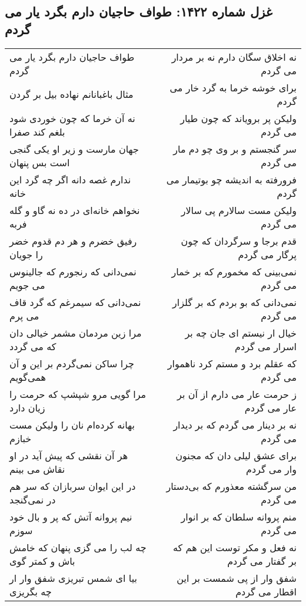 \begin{center}
\section*{غزل شماره ۱۴۲۲: طواف حاجیان دارم بگرد یار می گردم}
\label{sec:1422}
\begin{longtable}{l p{0.5cm} r}
طواف حاجیان دارم بگرد یار می گردم
&&
نه اخلاق سگان دارم نه بر مردار می گردم
\\
مثال باغبانانم نهاده بیل بر گردن
&&
برای خوشه خرما به گرد خار می گردم
\\
نه آن خرما که چون خوردی شود بلغم کند صفرا
&&
ولیکن پر برویاند که چون طیار می گردم
\\
جهان مارست و زیر او یکی گنجی است بس پنهان
&&
سر گنجستم و بر وی چو دم مار می گردم
\\
ندارم غصه دانه اگر چه گرد این خانه
&&
فرورفته به اندیشه چو بوتیمار می گردم
\\
نخواهم خانه‌ای در ده نه گاو و گله فربه
&&
ولیکن مست سالارم پی سالار می گردم
\\
رفیق خضرم و هر دم قدوم خضر را جویان
&&
قدم برجا و سرگردان که چون پرگار می گردم
\\
نمی‌دانی که رنجورم که جالینوس می جویم
&&
نمی‌بینی که مخمورم که بر خمار می گردم
\\
نمی‌دانی که سیمرغم که گرد قاف می پرم
&&
نمی‌دانی که بو بردم که بر گلزار می گردم
\\
مرا زین مردمان مشمر خیالی دان که می گردد
&&
خیال ار نیستم ای جان چه بر اسرار می گردم
\\
چرا ساکن نمی‌گردم بر این و آن همی‌گویم
&&
که عقلم برد و مستم کرد ناهموار می گردم
\\
مرا گویی مرو شپشپ که حرمت را زیان دارد
&&
ز حرمت عار می دارم از آن بر عار می گردم
\\
بهانه کرده‌ام نان را ولیکن مست خبازم
&&
نه بر دینار می گردم که بر دیدار می گردم
\\
هر آن نقشی که پیش آید در او نقاش می بینم
&&
برای عشق لیلی دان که مجنون وار می گردم
\\
در این ایوان سربازان که سر هم در نمی‌گنجد
&&
من سرگشته معذورم که بی‌دستار می گردم
\\
نیم پروانه آتش که پر و بال خود سوزم
&&
منم پروانه سلطان که بر انوار می گردم
\\
چه لب را می گزی پنهان که خامش باش و کمتر گوی
&&
نه فعل و مکر توست این هم که بر گفتار می گردم
\\
بیا ای شمس تبریزی شفق وار ار چه بگریزی
&&
شفق وار از پی شمست بر این اقطار می گردم
\\
\end{longtable}
\end{center}
